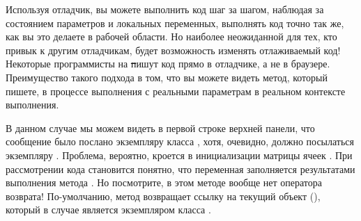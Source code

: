 \documentclass[a4paper,10pt,twoside]{book}
\begin{document}
Используя отладчик, вы можете выполнить код шаг за шагом, наблюдая за состоянием параметров и локальных переменных, выполнять код точно так же, как вы это делаете в рабочей области. Но наиболее неожиданной для тех, кто привык к другим отладчикам, будет возможность изменять отлаживаемый код! Некоторые программисты на \st пишут код прямо в отладчике, а не в браузере. Преимущество такого подхода в том, что вы можете видеть метод, который пишете, в процессе выполнения с реальными параметрам в реальном контексте выполнения.

В данном случае мы можем видеть в первой строке верхней панели, что сообщение  было послано экземпляру класса , хотя, очевидно, должно посылаться экземпляру .
Проблема, вероятно, кроется в инициализации матрицы ячеек .
При рассмотрении кода  становится понятно, что переменная  заполняется результатами выполнения метода . Но посмотрите, в этом методе вообще нет оператора возврата!
По-умолчанию, метод возвращает ссылку на текущий объект (), который в случае  является экземпляром класса .

\dothis{Закройте окно отладчика.
Добавьте выражение ``\ct{^ c}'' в конец метода \ct{LOGame>>>newCellAt:at:}, чтобы он возвращал значение переменной \ct{c}.
(см. \mthref{newCellAt:at:nobug}.)}
\end{document}
